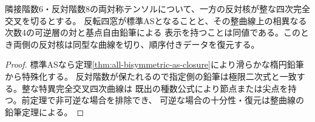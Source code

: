 \begin{corollary}\label{cor:one-integral-apolar-recognition}
隣接階数6・反対階数8の両対称テンソルについて、一方の反対核が整な四次完全交叉を切るとする。
反転四窓が標準ASとなることと、その整曲線上の相異なる次数4の可逆層の対と基点自由鉛筆による
表示を持つことは同値である。このとき両側の反対核は同型な曲線を切り、順序付きデータを復元する。
\end{corollary}
\begin{proof}
標準ASなら定理\ref{thm:all-bisymmetric-as-closure}により滑らかな楕円鉛筆から特殊化する。
反対階数が保たれるので指定側の鉛筆は極限二次式と一致する。整な特異完全交叉四次曲線は
既出の種数公式により節点または尖点を持つ。前定理で非可逆な場合を排除でき、
可逆な場合の十分性・復元は整曲線の鉛筆定理による。
\end{proof}

